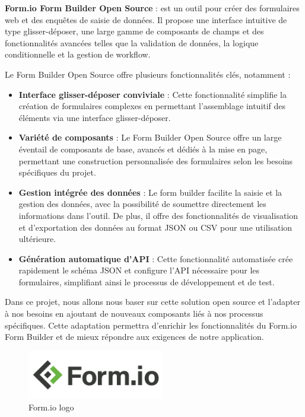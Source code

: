\textbf{Form.io Form Builder Open Source} : est un outil pour créer des formulaires web et des enquêtes de saisie de données. Il propose une interface intuitive de type glisser-déposer, une large gamme de composants de champs et des fonctionnalités avancées telles que la validation de données, la logique conditionnelle et la gestion de workflow.

Le Form Builder Open Source offre plusieurs fonctionnalités clés, notamment :

\begin{itemize}
    \item \textbf{Interface glisser-déposer conviviale} : Cette fonctionnalité simplifie la création de formulaires complexes en permettant l'assemblage intuitif des éléments via une interface glisser-déposer.

    \item \textbf{Variété de composants} : Le Form Builder Open Source offre un large éventail de composants de base, avancés et dédiés à la mise en page, permettant une construction personnalisée des formulaires selon les besoins spécifiques du projet.

    \item \textbf{Gestion intégrée des données} : Le form builder facilite la saisie et la gestion des données, avec la possibilité de soumettre directement les informations dans l'outil. De plus, il offre des fonctionnalités de visualisation et d'exportation des données au format JSON ou CSV pour une utilisation ultérieure.

    \item \textbf{Génération automatique d'API} : Cette fonctionnalité automatisée crée rapidement le schéma JSON et configure l'API nécessaire pour les formulaires, simplifiant ainsi le processus de développement et de test.
\end{itemize}

Dans ce projet, nous allons nous baser sur cette solution open source et l'adapter à nos besoins en ajoutant de nouveaux composants liés à nos processus spécifiques. Cette adaptation permettra d'enrichir les fonctionnalités du Form.io Form Builder et de mieux répondre aux exigences de notre application.
\\
\begin{figure}[H]
    \centering
    \includegraphics[width=6cm]{Figures/dormiologo.png}
    \caption{Form.io logo}
\end{figure}




